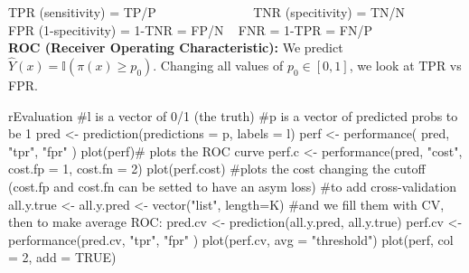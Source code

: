 TPR (sensitivity) = TP/P $\qquad\qquad\qquad\quad$  TNR (specitivity) = TN/N\\
FPR (1-specitivity) = 1-TNR = FP/N  \qquad \hbox{     } FNR = 1-TPR = FN/P\\
\textbf{ROC (Receiver Operating Characteristic):}
We predict $\hat Y(x) = \mathbb{I}(\pi(x)\geq p_0)$. Changing all values of $p_0 \in [0, 1]$, we look at TPR vs FPR. \\
\begin{codebox}{r}{Evaluation}
#l is a vector of 0/1 (the truth)
#p is a vector of predicted probs to be 1
pred <- prediction(predictions = p, labels = l)
perf <- performance( pred, "tpr", "fpr" )
plot(perf)# plots the ROC curve
perf.c <- performance(pred, "cost", cost.fp = 1, cost.fn = 2)
plot(perf.cost)
#plots the cost changing the cutoff (cost.fp and cost.fn can be setted to have an asym loss)
#to add cross-validation
all.y.true <- all.y.pred <- vector("list", length=K)
#and we fill them with CV, then to make average ROC:
pred.cv <- prediction(all.y.pred, all.y.true)
perf.cv <- performance(pred.cv, "tpr", "fpr" )
plot(perf.cv, avg = "threshold")
plot(perf, col = 2, add = TRUE)
\end{codebox}
